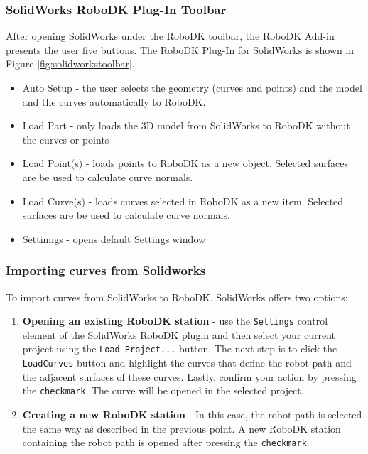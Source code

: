 \subsubsection*{SolidWorks RoboDK Plug-In Toolbar}

After opening SolidWorks under the RoboDK toolbar, the RoboDK Add-in presents the user five buttons. The RoboDK Plug-In for SolidWorks is shown in Figure  \ref{fig:solidworkstoolbar}. 

\begin{itemize}
    \item Auto Setup - the user selects the geometry (curves and points) and the model and the curves automatically to RoboDK.
    \item Load Part - only loads the 3D model from SolidWorks to RoboDK without the curves or points
    \item Load Point(s) - loads points to RoboDK as a new object. Selected surfaces are be used to calculate curve normals. 
    \item Load Curve(s) -  loads curves selected in RoboDK as a new item. Selected surfaces are be used to calculate curve normals. 
    \item Settinngs - opens default Settings window
\end{itemize}

\subsubsection*{Importing curves from Solidworks}

To import curves from SolidWorks to RoboDK, SolidWorks offers two options:

\begin{enumerate}

\item \textbf{Opening an existing RoboDK station} - use the \texttt{Settings} control element of the SolidWorks RoboDK plugin and then select your current project using the \texttt{Load Project...} button. The next step is to click the \texttt{LoadCurves} button and highlight the curves that define the robot path and the adjacent surfaces of these curves. Lastly, confirm your action by pressing the \texttt{checkmark}. The curve will be opened in the selected project. 

\item \textbf{Creating a new RoboDK station} - In this case, the robot path is selected the same way as described in the previous point. A new RoboDK station containing the robot path is opened after pressing the \texttt{checkmark}.

\end{enumerate}


